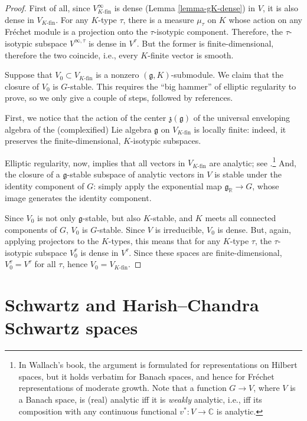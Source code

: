 \begin{proof}
First of all, since $V^\infty_{K\text{-fin}}$ is dense (Lemma \ref{lemma-gK-dense}) in $V$, it is also dense in $V_{K\text{-fin}}$. For any $K$-type $\tau$, there is a measure $\mu_\tau$ on $K$ whose action on any Fr\'echet module is a projection onto the $\tau$-isotypic component. Therefore, the $\tau$-isotypic subspace $V^{\infty,\tau}$ is dense in $V^\tau$. But the former is finite-dimensional, therefore the two coincide, i.e., every $K$-finite vector is smooth.

Suppose that $V_0\subset V_{K\text{-fin}}$ is a nonzero $(\mathfrak g, K)$-submodule. We claim that the closure of $V_0$ is $G$-stable. This requires the ``big hammer'' of elliptic regularity to prove, so we only give a couple of steps, followed by references.

First, we notice that the action of the center $\mathfrak z(\mathfrak g)$ of the universal enveloping algebra of the (complexified) Lie algebra $\mathfrak g$ on $V_{K\text{-fin}}$ is locally finite: indeed, it preserves the finite-dimensional, $K$-isotypic subspaces. 

Elliptic regularity, now, implies that all vectors in $V_{K\text{-fin}}$ are analytic; see \cite[3.4.9]{Wallach-RR1}.\footnote{In Wallach's book, the argument is formulated for representations on Hilbert spaces, but it holds verbatim for Banach spaces, and hence for Fr\'echet representations of moderate growth. Note that a function $G\to V$, where $V$ is a Banach space, is (real) analytic iff it is \emph{weakly} analytic, i.e., iff its composition with any continuous functional $v^*: V\to \mathbb C$ is analytic.} And, the closure of a $\mathfrak g$-stable subspace of analytic vectors in $V$ is stable under the identity component of $G$: simply apply the exponential map $\mathfrak g_{\mathbb R} \to G$, whose image generates the identity component. 

Since $V_0$ is not only $\mathfrak g$-stable, but also $K$-stable, and $K$ meets all connected components of $G$, $V_0$ is $G$-stable. Since $V$ is irreducible, $V_0$ is dense. But, again, applying projectors to the $K$-types, this means that for any $K$-type $\tau$, the $\tau$-isotypic subspace $V_0^\tau$ is dense in $V^\tau$. Since these spaces are finite-dimensional, $V_0^\tau=V^\tau$ for all $\tau$, hence $V_0 = V_{K\text{-fin}}$. 
\end{proof}





\section{Schwartz and Harish--Chandra Schwartz spaces}
\label{section-Schwartz}


